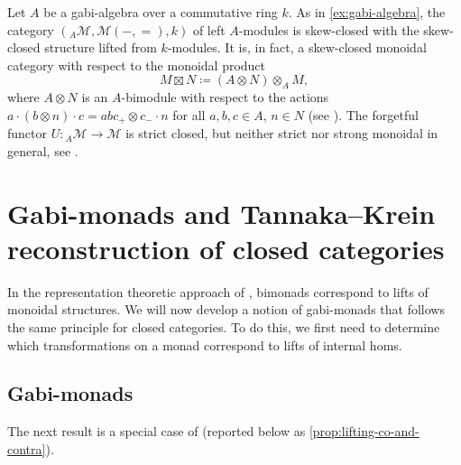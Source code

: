 \documentclass[12pt,dvipsnames,oneside]{amsart}
\theoremstyle{plain}
\theoremstyle{remark}
\theoremstyle{definition}
\newcommand*{\blank}{{-}}
\newcommand*{\bblank}{{=}}
\newcommand{\forget}{U}
\newcommand{\cM}{\mathcal{M}}
\begin{document}
\begin{example}\label{ex:gabi-algebra-forgetful-functor}
  Let \(A\) be a gabi-algebra over a commutative ring \(k\). As in \cref{ex:gabi-algebra}, the category \(\left({}_A\cM,\cM(\blank,\bblank),k\right)\) of left \(A\)-modules is skew-closed with the skew-closed structure lifted from \(k\)-modules. It is, in fact, a skew-closed monoidal category with respect to the monoidal product
  \begin{equation*}
    M \boxtimes N \coloneqq (A \otimes N) \otimes_A M,
  \end{equation*}
  where \(A \otimes N\) is an \(A\)-bimodule with respect to the actions \(a \cdot (b \otimes n) \cdot c = abc_+ \otimes c_-\cdot n\) for all \(a,b,c \in A\), \(n \in N\) (see \cite[Proposition~4.12]{Berger-Vercruysse-Saracco}).
  The forgetful functor \(\forget \colon {}_A\cM \to \cM\) is strict closed, but neither strict nor strong monoidal in general, see \cite[Example~4.4]{Berger-Vercruysse-Saracco}.
\end{example}

\section{Gabi-monads and Tannaka--Krein reconstruction of closed categories}\label{sec:gabi}


In the representation theoretic approach of \cite{Moerdijk2002,McCrudden2002,Bruguieres2007,BruguieresLackVirelizier},
bimonads correspond to lifts of monoidal structures.
We will now develop a notion of gabi-monads that follows the same principle for closed categories.
To do this, we first need to determine which transformations on a monad correspond to lifts of internal homs.

\subsection{Gabi-monads}\label{sec:gabi-monads}

The next result is a special case of \cite[Theorem~A.2]{Berger-Vercruysse-Saracco} (reported below as \cref{prop:lifting-co-and-contra}).
\end{document}
